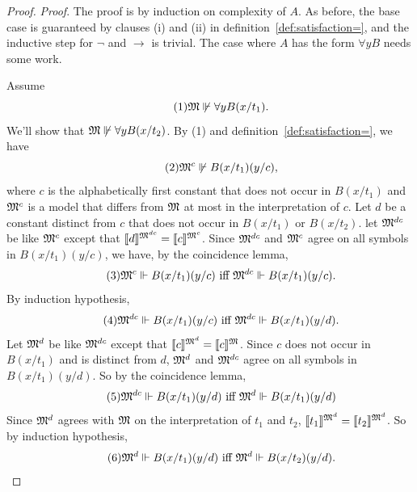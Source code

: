 \begin{proof}
  \emph{Proof}.
  The proof is by induction on complexity of $A$.
  As before,
  the base case is guaranteed by clauses (i) and (ii) in definition~\ref{def:satisfaction=},
  and the inductive step for $\neg$ and $\to$ is trivial.
  The case where $A$ has the form $\forall y B$ needs some work.

  Assume
  \begin{equation}\tag{1}
    \mathfrak{M} \not\Vdash \forall y B(x/t_1).
  \end{equation}
  We'll show that $\mathfrak{M} \not\Vdash \forall y B(x/t_2)$.
  By (1) and definition~\ref{def:satisfaction=},
  we have
  \begin{equation}\tag{2}
    \mathfrak{M}^c \not\Vdash B(x/t_1)(y/c),
  \end{equation}
  where $c$ is the alphabetically first constant that does not occur in $B(x/t_1)$
  and $\mathfrak{M}^c$ is a model that differs from $\mathfrak{M}$ at most in
  the interpretation of $c$.
  Let $d$ be a constant distinct from $c$ that does not occur in $B(x/t_1)$ or $B(x/t_2)$.
  let $\mathfrak{M}^{dc}$ be like $\mathfrak{M}^c$ except that
  $\llbracket d \rrbracket^{\mathfrak{M}^{dc}} = \llbracket c \rrbracket^{\mathfrak{M}^c}$.
  Since $\mathfrak{M}^{dc}$ and $\mathfrak{M}^c$ agree on all symbols in $B(x/t_1)(y/c)$,
  we have,
  by the coincidence lemma,
  \begin{equation}\tag{3}
    \mathfrak{M}^c \Vdash B(x/t_1)(y/c) \text{ iff }\mathfrak{M}^{dc} \Vdash B(x/t_1)(y/c).
  \end{equation}
  By induction hypothesis,
  \begin{equation}\tag{4}
    \mathfrak{M}^{dc} \Vdash B(x/t_1)(y/c) \text{ iff }\mathfrak{M}^{dc} \Vdash B(x/t_1)(y/d).
  \end{equation}
  Let $\mathfrak{M}^d$ be like $\mathfrak{M}^{dc}$ except that
  $\llbracket c \rrbracket^{\mathfrak{M}^d} = \llbracket c \rrbracket^{\mathfrak{M}}$.
  Since $c$ does not occur in $B(x/t_1)$ and is distinct from $d$,
  $\mathfrak{M}^d$ and $\mathfrak{M}^{dc}$ agree on all symbols in $B(x/t_1)(y/d)$.
  So by the coincidence lemma,
  \begin{equation}\tag{5}
    \mathfrak{M}^{dc} \Vdash B(x/t_1)(y/d) \text{ iff }\mathfrak{M}^{d} \Vdash B(x/t_1)(y/d)
  \end{equation}
  Since $\mathfrak{M}^d$ agrees with $\mathfrak{M}$ on the interpretation of $t_1$ and $t_2$,
  $\llbracket t_1 \rrbracket^{\mathfrak{M}^d} = \llbracket t_2 \rrbracket^{\mathfrak{M}^d}$.
  So by induction hypothesis,
  \begin{equation}\tag{6}
    \Mod{M}^d \satisfies B(x/t_1)(y/d) \text{ iff }\Mod{M}^d \satisfies B(x/t_2)(y/d).

\end{equation}
\end{proof}
